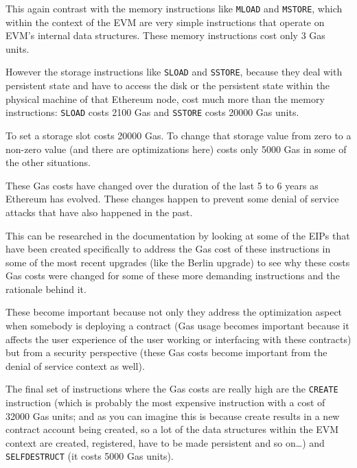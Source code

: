This again contrast with the memory instructions like \texttt{MLOAD} and
\texttt{MSTORE}, which within the context of the EVM are very simple
instructions that operate on EVM's internal data structures. These
memory instructions cost only 3 Gas units.

However the storage instructions like \texttt{SLOAD} and
\texttt{SSTORE}, because they deal with persistent state and have to
access the disk or the persistent state within the physical machine of
that Ethereum node, cost much more than the memory instructions:
\texttt{SLOAD} costs 2100 Gas and \texttt{SSTORE} costs 20000 Gas units.

To set a storage slot costs 20000 Gas. To change that storage value from
zero to a non-zero value (and there are optimizations here) costs only
5000 Gas in some of the other situations.

These Gas costs have changed over the duration of the last 5 to 6 years
as Ethereum has evolved. These changes happen to prevent some denial of
service attacks that have also happened in the past.

This can be researched in the documentation by looking at some of the
EIPs that have been created specifically to address the Gas cost of
these instructions in some of the most recent upgrades (like the Berlin
upgrade) to see why these costs Gas costs were changed for some of these
more demanding instructions and the rationale behind it.

These become important because not only they address the optimization
aspect when somebody is deploying a contract (Gas usage becomes
important because it affects the user experience of the user working or
interfacing with these contracts) but from a security perspective (these
Gas costs become important from the denial of service context as well).

The final set of instructions where the Gas costs are really high are
the \texttt{CREATE} instruction (which is probably the most expensive
instruction with a cost of 32000 Gas units; and as you can imagine this
is because create results in a new contract account being created, so a
lot of the data structures within the EVM context are created,
registered, have to be made persistent and so on\ldots) and
\texttt{SELFDESTRUCT} (it costs 5000 Gas units).

